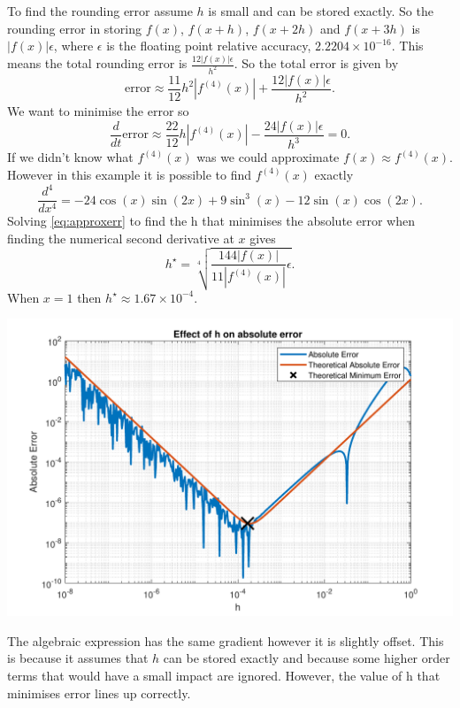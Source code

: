 \documentclass[a4paper,11pt]{article}
\begin{document}
\begin{enumerate}
\begin{enumerate}
		To find the rounding error assume $h$ is small and can be stored 
		exactly. So the rounding error in storing $f(x)$, $f(x+h)$, $f(x+2h)$ 
		and $f(x+3h)$ is $|f(x)|\epsilon$, where $\epsilon$ is the floating 
		point relative accuracy, $2.2204\times 10^{-16}$. This means the 
		total 
		rounding error is $\frac{12|f(x)|\epsilon}{h^{2}}$. So the total 
		error is given by
		\begin{equation}
			\text{error} \approx \frac{11}{12}h^{2}|f^{(4)}(x)| + 
			\frac{12|f(x)|\epsilon}{h^{2}}.
		\end{equation}
		We want to minimise the error so
		\begin{equation}
			\frac{d}{dt}\text{error} \approx \frac{22}{12}h|f^{(4)}(x)| - 
			\frac{24|f(x)|\epsilon}{h^{3}}=0.
			\label{eq:approxerr}
		\end{equation}
		If we didn't know what $f^{(4)}(x)$ was we could approximate 
		$f(x)\approx f^{(4)}(x)$. However in this example it is possible to 
		find $f^{(4)}(x)$ exactly
		\begin{equation}
			\frac{d^{4}}{dx^{4}} = -24\cos(x)\sin(2x) + 9\sin^{3}(x) - 
			12\sin(x)\cos(2x).
		\end{equation}
		Solving \autoref{eq:approxerr} to find the h that minimises the 
		absolute error when finding the numerical second derivative at $x$ 
		gives
		\begin{equation}
			h^{\star} = \sqrt[4]{\frac{144|f(x)|}{11|f^{(4)}(x)|}\epsilon}.
		\end{equation}
		When $x=1$ then $h^{\star}\approx1.67\times10^{-4}$.
		\begin{center}
			\includegraphics[scale=0.7]{images/Q2bii.pdf}
		\end{center}
		The algebraic expression has the same gradient however it is slightly 
		offset. 
		This is because it assumes that $h$ can be stored exactly and because 
		some higher order terms that would have a small impact are ignored. 
		However, the value of h that 
		minimises error lines up correctly.
	\end{enumerate}
\end{enumerate}
\end{document}
